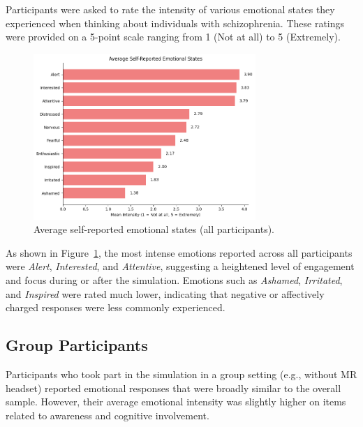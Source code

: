Participants were asked to rate the intensity of various emotional states they experienced when thinking about individuals with schizophrenia. These ratings were provided on a 5-point scale ranging from 1 (Not at all) to 5 (Extremely).

\begin{figure}[H]
    \centering
    \includegraphics[width=0.75\textwidth]{../../Figures/emotional-post-all.png}
    \caption{Average self-reported emotional states (all participants).}
    \label{fig:emotional_post_all}
\end{figure}

As shown in Figure~\ref{fig:emotional_post_all}, the most intense emotions reported across all participants were \textit{Alert}, \textit{Interested}, and \textit{Attentive}, suggesting a heightened level of engagement and focus during or after the simulation. Emotions such as \textit{Ashamed}, \textit{Irritated}, and \textit{Inspired} were rated much lower, indicating that negative or affectively charged responses were less commonly experienced.

\subsection{Group Participants}

Participants who took part in the simulation in a group setting (e.g., without MR headset) reported emotional responses that were broadly similar to the overall sample. However, their average emotional intensity was slightly higher on items related to awareness and cognitive involvement.

